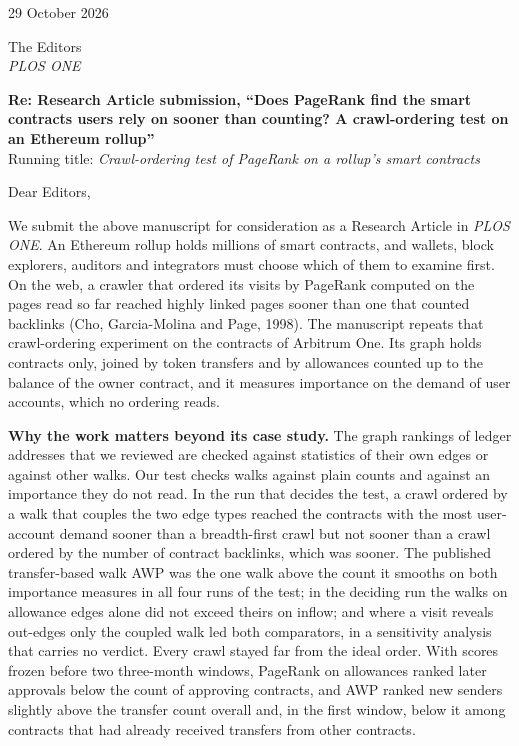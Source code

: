 \documentclass[11pt,a4paper]{article}
\begin{document}
\small

\begin{flushright}
29 October 2026
\end{flushright}

The Editors\\
\textit{PLOS ONE}

\textbf{Re: Research Article submission, ``Does PageRank find the smart contracts users rely on sooner than counting? A crawl-ordering test on an Ethereum rollup''}\\
Running title: \textit{Crawl-ordering test of PageRank on a rollup's smart contracts}

Dear Editors,

We submit the above manuscript for consideration as a Research Article in \textit{PLOS ONE}. An Ethereum rollup holds millions of smart contracts, and wallets, block explorers, auditors and integrators must choose which of them to examine first. On the web, a crawler that ordered its visits by PageRank computed on the pages read so far reached highly linked pages sooner than one that counted backlinks (Cho, Garcia-Molina and Page, 1998). The manuscript repeats that crawl-ordering experiment on the contracts of Arbitrum One. Its graph holds contracts only, joined by token transfers and by allowances counted up to the balance of the owner contract, and it measures importance on the demand of user accounts, which no ordering reads.

\textbf{Why the work matters beyond its case study.} The graph rankings of ledger addresses that we reviewed are checked against statistics of their own edges or against other walks. Our test checks walks against plain counts and against an importance they do not read. In the run that decides the test, a crawl ordered by a walk that couples the two edge types reached the contracts with the most user-account demand sooner than a breadth-first crawl but not sooner than a crawl ordered by the number of contract backlinks, which was sooner. The published transfer-based walk AWP was the one walk above the count it smooths on both importance measures in all four runs of the test; in the deciding run the walks on allowance edges alone did not exceed theirs on inflow; and where a visit reveals out-edges only the coupled walk led both comparators, in a sensitivity analysis that carries no verdict. Every crawl stayed far from the ideal order. With scores frozen before two three-month windows, PageRank on allowances ranked later approvals below the count of approving contracts, and AWP ranked new senders slightly above the transfer count overall and, in the first window, below it among contracts that had already received transfers from other contracts.
\end{document}
